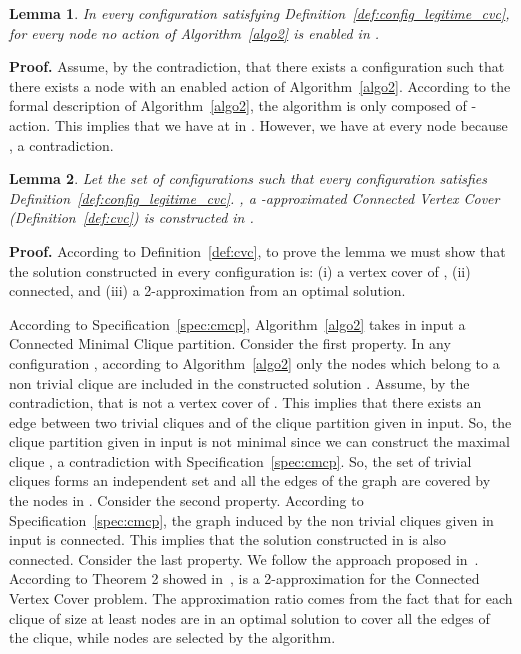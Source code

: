 \documentclass[11pt,letterpaper,onecolumn]{article}
\newtheorem{lemma}{Lemma}
\newenvironment{proof}{\noindent \begin{rm}{\textbf{Proof.} }}{\hspace*{\fill}\par\end{rm} \vspace{.3cm}}
\begin{document}
\begin{lemma}
\label{lem:no_enable_action_cvc}
In every configuration  satisfying Definition~\ref{def:config_legitime_cvc}, for every node  no action of Algorithm~\ref{algo2} is enabled in .
\end{lemma}

\begin{proof}
Assume, by the contradiction, that there exists a configuration  such that there exists a node  with an enabled action of Algorithm~\ref{algo2}. According to the formal description of Algorithm~\ref{algo2}, the algorithm is only composed of -action. This implies that we have  at  in . However, we have  at every node  because , a contradiction.
\end{proof}

\begin{lemma}
\label{lem:sol_cvc_config_legitime}
Let the set of configurations  such that every configuration  satisfies Definition~\ref{def:config_legitime_cvc}. , a -approximated Connected Vertex Cover (Definition~\ref{def:cvc}) is constructed in .
\end{lemma}

\begin{proof}
According to Definition~\ref{def:cvc}, to prove the lemma we must show that the solution  constructed in every configuration  is: (i) a vertex cover of , (ii) connected, and (iii) a 2-approximation from an optimal solution.

According to Specification~\ref{spec:cmcp}, Algorithm~\ref{algo2} takes in input a Connected Minimal Clique partition. Consider the first property. In any configuration , according to Algorithm~\ref{algo2} only the nodes which belong to a non trivial clique are included in the constructed solution . Assume, by the contradiction, that  is not a vertex cover of . This implies that there exists an edge between two trivial cliques  and  of the clique partition given in input. So, the clique partition given in input is not minimal since we can construct the maximal clique , a contradiction with Specification~\ref{spec:cmcp}. So, the set of trivial cliques forms an independent set and all the edges of the graph are covered by the nodes in . Consider the second property. According to Specification~\ref{spec:cmcp}, the graph induced by the non trivial cliques given in input is connected. This implies that the solution  constructed in  is also connected. Consider the last property. We follow the approach proposed in~\cite{DelbotLP13}. According to Theorem 2 showed in~\cite{DelbotLP13},  is a 2-approximation for the Connected Vertex Cover problem. The approximation ratio comes from the fact that for each clique of size  at least  nodes are in an optimal solution to cover all the  edges of the clique, while  nodes are selected by the algorithm.
\end{proof}
\end{document}
